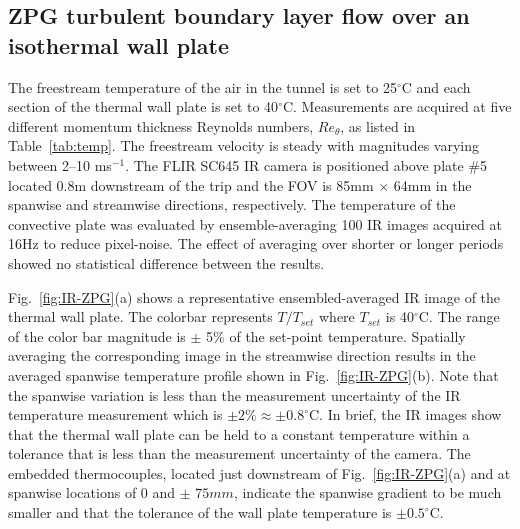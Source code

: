 \subsection{ZPG turbulent boundary layer flow over an isothermal wall plate}
The freestream temperature  of the air in the tunnel is set to 25$^\circ$C and each section of the thermal wall plate is set to 40$^\circ$C. Measurements are acquired at five different momentum thickness Reynolds numbers, $Re_\theta$, as listed in Table~\ref{tab:temp}. The freestream velocity is steady with magnitudes varying between 2--10 ms$^{-1}$. The FLIR SC645 IR camera is positioned above plate \#5 located 0.8m downstream of the trip and the FOV is 85mm $\times$ 64mm in the spanwise and streamwise directions, respectively. The temperature of the convective plate was evaluated by ensemble-averaging 100 IR images acquired at 16Hz to reduce pixel-noise. The effect of averaging over shorter or longer periods showed no statistical difference between the results.

Fig.~\ref{fig:IR-ZPG}(a) shows a representative ensembled-averaged IR image of the thermal wall plate. The colorbar represents $T/T_{set}$ where $T_{set}$ is 40$^\circ$C. The range of the color bar magnitude is $\pm$ 5\% of the set-point temperature. Spatially averaging the corresponding image in the streamwise direction results in the averaged spanwise temperature profile shown in Fig.~\ref{fig:IR-ZPG}(b). Note that the spanwise variation is less than the measurement uncertainty of the IR temperature measurement which is $\pm 2\% \approx \pm 0.8 ^\circ$C.  In brief, the IR images show that the thermal wall plate can be held to a constant temperature within a tolerance that is less than the measurement uncertainty of the camera. The embedded thermocouples, located just downstream of Fig.~\ref{fig:IR-ZPG}(a) and at spanwise locations of 0 and $\pm$ $75mm$, indicate the spanwise gradient to be much smaller and that the tolerance of the wall plate temperature is $\pm 0.5^\circ$C.



